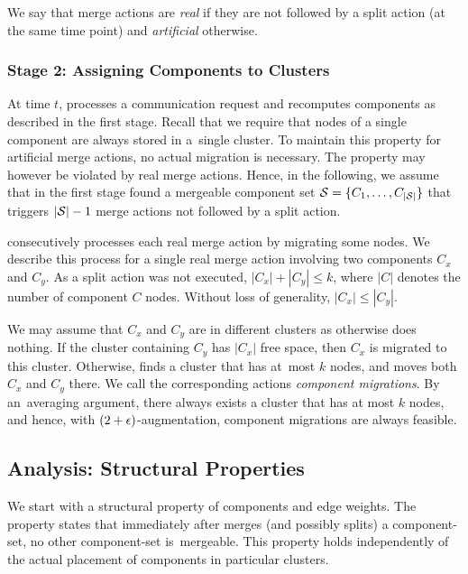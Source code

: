 We say that merge actions are \emph{real} if they are not followed
by a split action (at the same time point) and \emph{artificial} otherwise. 



\subsubsection{Stage 2: Assigning Components to Clusters}

At time $t$, \CREP processes a communication request and recomputes components
as described in the first stage. Recall that we require that nodes of a single
component are always stored in a~single cluster. To maintain this property for
artificial merge actions, no actual migration is necessary. The property may
however be violated by real merge actions. Hence, in the following, we assume
that in the first stage \CREP found a mergeable component set $\mathcal{S} = \{ C_1, 
\ldots, C_{|\mathcal{S}|} \}$ that triggers $|\mathcal{S}|-1$ merge actions not 
followed by a split action.

\CREP consecutively processes each real merge action by migrating some nodes.
We describe this process for a single real merge action involving two
components $C_x$ and $C_y$. As a split action was not executed, $|C_x| +
|C_y| \leq k$, where $|C|$ denotes the number of component $C$ nodes.
Without loss of generality, $|C_x| \leq |C_y|$.

We may assume that $C_x$ and $C_y$ are in different clusters as otherwise
\CREP does nothing. If the cluster containing $C_y$ has $|C_x|$ free space,
then $C_x$ is migrated to this cluster. Otherwise, \CREP finds a cluster that
has at~most $k$ nodes, and moves both $C_x$ and $C_y$ there. We call the
corresponding actions \emph{component migrations}. By an~averaging argument,
there always exists a cluster that has at most $k$ nodes, and hence, with
$(2+\epsilon)$-augmentation, component migrations are always feasible.


\subsection{Analysis: Structural Properties}

We start with a structural property of components and edge weights.
The property states that immediately after \CREP merges (and
possibly splits) a component-set, no other component-set is~mergeable. This
property holds independently of the actual placement of components in
particular clusters.

